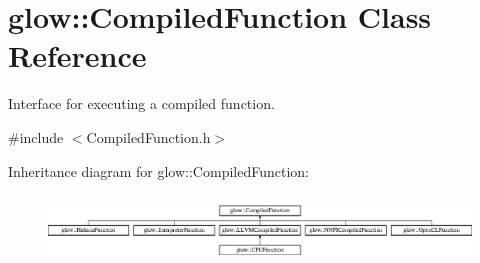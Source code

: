\hypertarget{classglow_1_1_compiled_function}{}\section{glow\+:\+:Compiled\+Function Class Reference}
\label{classglow_1_1_compiled_function}


Interface for executing a compiled function.  




{\ttfamily \#include $<$Compiled\+Function.\+h$>$}

Inheritance diagram for glow\+:\+:Compiled\+Function\+:\begin{figure}[H]
\begin{center}
\leavevmode
\includegraphics[height=1.796791cm]{classglow_1_1_compiled_function}
\end{center}
\end{figure}
